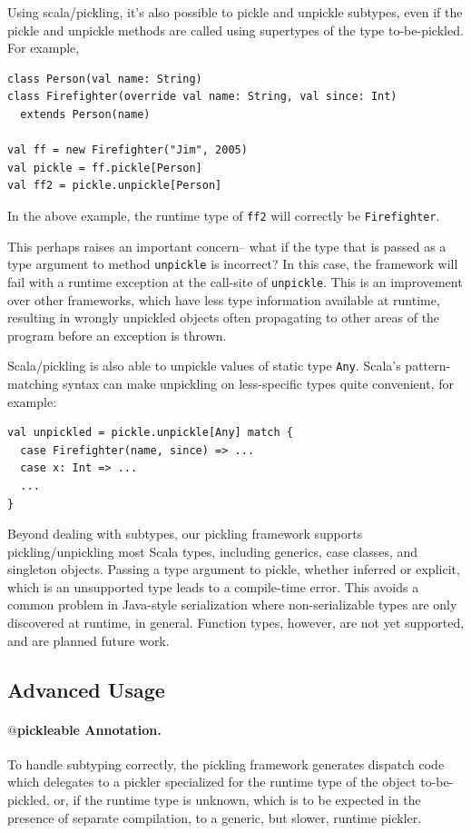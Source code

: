 \documentclass[preprint,10pt]{sigplanconf}
\theoremstyle{definition}
\theoremstyle{definition}
\newcommand{\term}[1]{\mbox{\texttt{#1}}}
\begin{document}
Using scala/pickling, it's
also possible to pickle and unpickle subtypes, even if the pickle and unpickle
methods are called using supertypes of the type to-be-pickled.
For example,

\begin{lstlisting}
class Person(val name: String)
class Firefighter(override val name: String, val since: Int)
  extends Person(name)

val ff = new Firefighter("Jim", 2005)
val pickle = ff.pickle[Person]
val ff2 = pickle.unpickle[Person]
\end{lstlisting}

In the above example, the runtime type of \term{ff2} will correctly be
\term{Firefighter}.

This perhaps raises an important concern-- what if the type that is passed as
a type argument to method \term{unpickle} is incorrect? In this case, the
framework will fail with a runtime exception at the call-site of
\term{unpickle}. This is an improvement over other frameworks, which have less
type information available at runtime, resulting in wrongly unpickled objects
often propagating to other areas of the program before an exception is thrown.

Scala/pickling is also able to unpickle values of static type
\term{Any}. Scala's pattern-matching syntax can make unpickling on less-specific
types quite convenient, for example:

\begin{lstlisting}
val unpickled = pickle.unpickle[Any] match {
  case Firefighter(name, since) => ...
  case x: Int => ...
  ...
}
\end{lstlisting}

Beyond dealing with subtypes, our pickling framework supports
pickling/unpickling most Scala types, including generics, case classes, and
singleton objects. Passing a type argument to pickle, whether inferred or
explicit, which is an unsupported type leads to a compile-time error. This
avoids a common problem in Java-style serialization where non-serializable
types are only discovered at runtime, in general. Function types, however, are
not yet supported, and are planned future work.

\subsection{Advanced Usage}
\label{sec:pickleable-annotation}

\paragraph{$@$pickleable Annotation.} To handle subtyping correctly, the
pickling framework generates dispatch code which delegates to a pickler
specialized for the runtime type of the object to-be-pickled, or, if the
runtime type is unknown, which is to be expected in the presence of separate
compilation, to a generic, but slower, runtime pickler.
\end{document}
